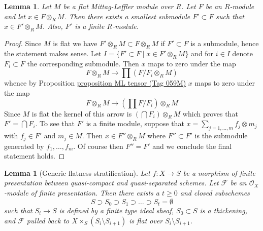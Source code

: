 \documentclass{amsart}
\theoremstyle{plain}
\newtheorem{lemma}[subsection]{Lemma}
\theoremstyle{definition}
\theoremstyle{remark}
\numberwithin{equation}{subsection}
\begin{document}
\begin{lemma}
\label{algebra-lemma-minimal-contains}
Let $M$ be a flat Mittag-Leffler module over $R$. Let $F$ be an $R$-module
and let $x \in F \otimes_R M$. Then there exists a smallest submodule
$F' \subset F$ such that $x \in F' \otimes_R M$.
Also, $F'$ is a finite $R$-module.
\end{lemma}

\begin{proof}
Since $M$ is flat we have $F' \otimes_R M \subset F \otimes_R M$
if $F' \subset F$ is a submodule, hence the statement makes sense.
Let $I = \{F' \subset F \mid x \in F' \otimes_R M\}$ and for
$i \in I$ denote $F_i \subset F$ the corresponding submodule.
Then $x$ maps to zero under the map
$$
F \otimes_R M \longrightarrow \prod (F/F_i \otimes_R M)
$$
whence by Proposition \href{https://stacks.math.columbia.edu/tag/059M}{proposition ML tensor (Tag 059M)}
$x$ maps to zero under the map
$$
F \otimes_R M \longrightarrow \left(\prod F/F_i\right) \otimes_R M
$$
Since $M$ is flat the kernel of this arrow is
$(\bigcap F_i) \otimes_R M$ which proves that $F' = \bigcap F_i$.
To see that $F'$ is a finite module, suppose that
$x = \sum_{j = 1, \ldots, m} f_j \otimes m_j$ with $f_j \in F'$
and $m_j \in M$. Then $x \in F'' \otimes_R M$ where $F'' \subset F'$ is
the submodule generated by $f_1, \ldots, f_m$. Of course then
$F'' = F'$ and we conclude the final statement holds.
\end{proof}


\begin{lemma}[Generic flatness stratification]
\label{more-morphisms-lemma-generic-flatness-stratification}
Let $f : X \to S$ be a morphism of finite presentation between quasi-compact
and quasi-separated schemes. Let $\mathcal{F}$ be an $\mathcal{O}_X$-module
of finite presentation. Then there exists a $t \geq 0$ and closed
subschemes
$$
S \supset S_0 \supset S_1 \supset \ldots \supset S_t = \emptyset
$$
such that $S_i \to S$ is defined by a finite type ideal sheaf,
$S_0 \subset S$ is a thickening, and $\mathcal{F}$ pulled back to
$X \times_S (S_i \setminus S_{i + 1})$ is flat over $S_i \setminus S_{i + 1}$.
\end{lemma}
\end{document}
